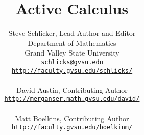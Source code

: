 \documentclass[11pt]{book}
\title{Active Calculus \\ \vspace{0.1in} \scalebox{0.75}{\texttt{[image: figures/CClicense.eps]}}}
\author{Steve Schlicker, Lead Author and Editor \\ Department of Mathematics \\ Grand Valley State University \\
\texttt{schlicks@gvsu.edu} \\
\href{http://faculty.gvsu.edu/schlicks/}{\texttt{http://faculty.gvsu.edu/schlicks/}}\\
\vspace{1.5in} \\
David Austin, Contributing Author \\
\href{http://merganser.math.gvsu.edu/david/}{\texttt{http://merganser.math.gvsu.edu/david/}} \\ \ \\
Matt Boelkins, Contributing Author \\
\href{http://faculty.gvsu.edu/boelkinm/}{\texttt{http://faculty.gvsu.edu/boelkinm/}} }
\theoremstyle{definition}
\begin{document}
\frontmatter
\maketitle
\tableofcontents

%

\mainmatter






\pagebreak

% 

\backmatter
	
\printindex
\end{document}

